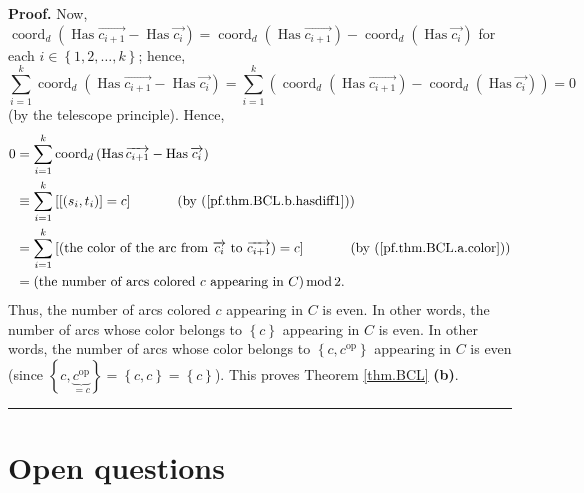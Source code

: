 \documentclass
[numbers=enddot,12pt,final,onecolumn,notitlepage,abstracton]{scrartcl}%
\theoremstyle{definition}
\newenvironment{proof}[1][Proof]{\noindent\textbf{#1.} }{\ \rule{0.5em}{0.5em}}
\let\sumnonlimits\sum
\renewcommand{\sum}{\sumnonlimits\limits}
\begin{document}
\begin{proof}
Now, $\operatorname*{coord}\nolimits_{d}\left(  \operatorname*{Has}%
\overrightarrow{c_{i+1}}-\operatorname*{Has}\overrightarrow{c_{i}}\right)
=\operatorname*{coord}\nolimits_{d}\left(  \operatorname*{Has}%
\overrightarrow{c_{i+1}}\right)  -\operatorname*{coord}\nolimits_{d}\left(
\operatorname*{Has}\overrightarrow{c_{i}}\right)  $ for each $i\in\left\{
1,2,\ldots,k\right\}  $; hence,%
\[
\sum_{i=1}^{k}\operatorname*{coord}\nolimits_{d}\left(  \operatorname*{Has}%
\overrightarrow{c_{i+1}}-\operatorname*{Has}\overrightarrow{c_{i}}\right)
=\sum_{i=1}^{k}\left(  \operatorname*{coord}\nolimits_{d}\left(
\operatorname*{Has}\overrightarrow{c_{i+1}}\right)  -\operatorname*{coord}%
\nolimits_{d}\left(  \operatorname*{Has}\overrightarrow{c_{i}}\right)
\right)  =0
\]
(by the telescope principle). Hence,%
\begin{align*}
0  &  =\sum_{i=1}^{k}\operatorname*{coord}\nolimits_{d}\left(
\operatorname*{Has}\overrightarrow{c_{i+1}}-\operatorname*{Has}%
\overrightarrow{c_{i}}\right) \\
&  \equiv\sum_{i=1}^{k}\left[  \left[  \left(  s_{i},t_{i}\right)  \right]
=c\right]  \ \ \ \ \ \ \ \ \ \ \left(  \text{by (\ref{pf.thm.BCL.b.hasdiff1}%
)}\right) \\
&  =\sum_{i=1}^{k}\left[  \left(  \text{the color of the arc from
}\overrightarrow{c_{i}}\text{ to }\overrightarrow{c_{i+1}}\right)  =c\right]
\ \ \ \ \ \ \ \ \ \ \left(  \text{by (\ref{pf.thm.BCL.a.color})}\right) \\
&  =\left(  \text{the number of arcs colored }c\text{ appearing in }C\right)
\operatorname{mod}2.
\end{align*}
Thus, the number of arcs colored $c$ appearing in $C$ is even. In other words,
the number of arcs whose color belongs to $\left\{  c\right\}  $ appearing in
$C$ is even. In other words, the number of arcs whose color belongs to
$\left\{  c,c^{\operatorname*{op}}\right\}  $ appearing in $C$ is even (since
$\left\{  c,\underbrace{c^{\operatorname*{op}}}_{=c}\right\}  =\left\{
c,c\right\}  =\left\{  c\right\}  $). This proves Theorem \ref{thm.BCL}
\textbf{(b)}.
\end{proof}

\section{Open questions}
\end{document}
